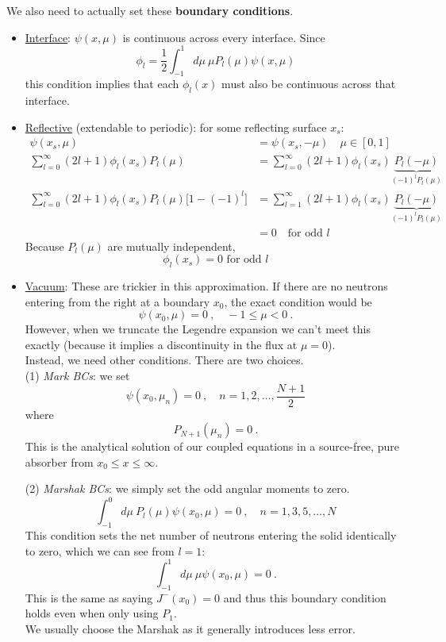 \documentclass[12pt]{article}
\begin{document}
We also need to actually set these \textbf{boundary conditions}.
\begin{itemize}
\item \underline{Interface}: $\psi(x,\mu)$ is continuous across every interface. Since
\[
\phi_l = \frac{1}{2}\int_{-1}^1 d\mu\: \mu P_{l}(\mu)\psi(x,\mu)
\]
this condition implies that each $\phi_l(x)$ must also be continuous across that interface. 

\item \underline{Reflective} (extendable to periodic): for some reflecting surface $x_s$:
\begin{align*}
\psi(x_s,\mu) &= \psi(x_s,-\mu) \quad \mu \in [0,1]\\
\sum_{l=0}^{\infty} (2l+1)\phi_l(x_s)P_l(\mu) &= \sum_{l=0}^{\infty} (2l+1)\phi_l(x_s)\underbrace{P_l(-\mu)}_{(-1)^l P_l(\mu)}\\
\sum_{l=0}^{\infty} (2l+1)\phi_l(x_s)P_l(\mu)\bigl[1 - (-1)^l\bigr] &= \sum_{l=1}^{\infty} (2l+1)\phi_l(x_s)\underbrace{P_l(-\mu)}_{(-1)^l P_l(\mu)}\\
&= 0 \quad \text{for odd }l
\end{align*}
Because $P_l(\mu)$ are mutually independent, 
\[\boxed{\phi_l(x_s) =0\text{ for odd }l}\]

\item \underline{Vacuum}: These are trickier in this approximation. If there are no neutrons entering from the right at a boundary $x_0$, the exact condition would be
\[
\psi(x_0, \mu) = 0\:, \quad -1 \leq \mu < 0\:.
\]
However, when we truncate the Legendre expansion we can't meet this exactly (because it implies a discontinuity in the flux at $\mu=0$).\\
Instead, we need other conditions. There are two choices.\\
(1) \textit{Mark BCs}: we set
\[
\psi(x_0, \mu_n) = 0\:, \quad n = 1, 2, \dots, \frac{N+1}{2}
\]
where 
\[
P_{N+1}(\mu_n) = 0\:.
\]
This is the analytical solution of our coupled equations in a source-free, pure absorber from $x_0 \leq x \leq \infty$.

(2) \textit{Marshak BCs}: we simply set the odd angular moments to zero. 
\[
\int_{-1}^0 d\mu\: P_{l}(\mu)\psi(x_0,\mu) = 0\:, \quad n = 1, 3, 5, \dots, N
\]
This condition sets the net number of neutrons entering the solid identically to zero, which we can see from $l=1$:
\[
\int_{-1}^1 d\mu\: \mu \psi(x_0,\mu) = 0\:.
\]
This is the same as saying $J^-(x_0) = 0$ and thus this boundary condition holds even when only using $P_1$. \\
We usually choose the Marshak as it generally introduces less error.  
\end{itemize}
\end{document}
